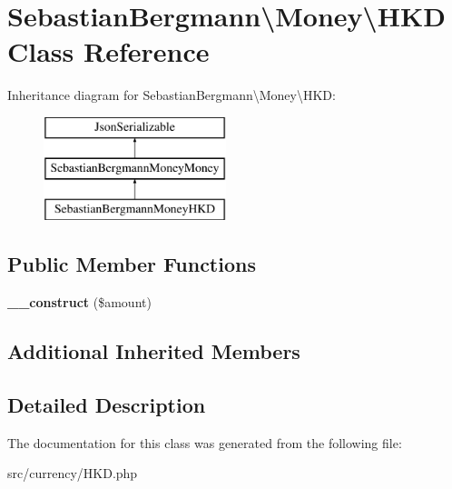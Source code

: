 \hypertarget{classSebastianBergmann_1_1Money_1_1HKD}{}\section{Sebastian\+Bergmann\textbackslash{}Money\textbackslash{}H\+K\+D Class Reference}
\label{classSebastianBergmann_1_1Money_1_1HKD}
Inheritance diagram for Sebastian\+Bergmann\textbackslash{}Money\textbackslash{}H\+K\+D\+:\begin{figure}[H]
\begin{center}
\leavevmode
\includegraphics[height=3.000000cm]{classSebastianBergmann_1_1Money_1_1HKD}
\end{center}
\end{figure}
\subsection*{Public Member Functions}
\begin{DoxyCompactItemize}
\item 
\hypertarget{classSebastianBergmann_1_1Money_1_1HKD_a75701de6597d5e017f6db8e1df38c2df}{}{\bfseries \+\_\+\+\_\+construct} (\$amount)\label{classSebastianBergmann_1_1Money_1_1HKD_a75701de6597d5e017f6db8e1df38c2df}

\end{DoxyCompactItemize}
\subsection*{Additional Inherited Members}


\subsection{Detailed Description}


The documentation for this class was generated from the following file\+:\begin{DoxyCompactItemize}
\item 
src/currency/H\+K\+D.\+php\end{DoxyCompactItemize}
